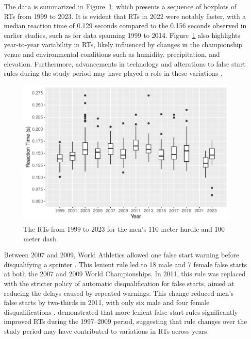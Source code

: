 \documentclass[12pt, letterpaper]{article}
\begin{document}
The data is summarized in Figure~\ref{fig:Boxplot}, which presents a
sequence of boxplots of RTs from 1999 to 2023. It is evident
that RTs in 2022 were notably faster, with a median reaction
time of 0.129 seconds compared to the 0.156 seconds observed in earlier
studies, such as \citet{brosnan2017effects} for data spanning 1999 to 2014.
Figure~\ref{fig:Boxplot} also highlights year-to-year variability in
RTs, likely influenced by changes in the championship venue
and environmental conditions such as humidity, precipitation, and
elevation. Furthermore, advancements in technology and alterations to
false start rules during the study period may have played a role in these
variations \citep{willwacher2013novel}.


\begin{figure}[tbp]
  \centering
  \includegraphics[width=\textwidth]{Boxplot}
  \caption{The RTs from 1999 to 2023 for the men's 110 meter hurdle
  and 100 meter dash.}
  \label{fig:Boxplot}
\end{figure}


Between 2007 and 2009, World Athletics allowed one
false start warning before disqualifying a sprinter \citep{iaaf2009falsestart}.
This lenient rule led to 18 male and 7 female false starts at both the 2007
and 2009 World Championships. In 2011, this rule was replaced with the stricter
policy of automatic disqualification for false starts, aimed at reducing the
delays caused by repeated warnings. This change reduced men’s false starts
by two-thirds in 2011, with only six male and four female disqualifications
\citep{iaaf2009falsestart}. \citet{haugen2013effect} demonstrated that more
lenient false start rules significantly improved RTs during the
1997–2009 period, suggesting that rule changes over the study period may
have contributed to variations in RTs across years.
\end{document}
